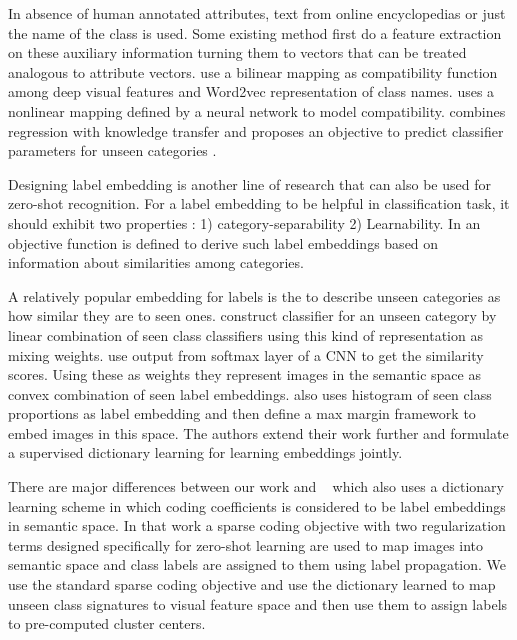 \documentclass[wcp]{jmlr}
\begin{document}
 In absence of human annotated attributes, text from online encyclopedias or just the name of the class is used. Some existing method
 first do a feature extraction on these auxiliary information turning them to vectors that can be treated analogous to attribute vectors.
 \cite{devise} use a bilinear mapping as compatibility function among deep visual features and Word2vec \cite{word2vec} representation of
 class names. \cite{ba2015} uses a nonlinear mapping defined by a neural network to model compatibility.
  \cite{mohamed13} combines regression with knowledge transfer and proposes an objective to predict classifier parameters
 for unseen categories .

 Designing label embedding is another line of research that can also be used for zero-shot recognition. For a label embedding to be helpful in classification task,
 it should exhibit two properties \cite{Yu2013}: 1) category-separability 2) Learnability. In \cite{Yu2013} an objective function is defined to derive
 such label embeddings based on information about similarities among categories.

A relatively popular embedding for labels is the to describe unseen categories as how similar they are to seen ones.
\cite{costa} construct  classifier for an unseen category by linear combination of seen class classifiers
using this kind of representation as mixing weights. \cite{convex} use output from softmax layer of a CNN to get the similarity scores.
Using these as weights they represent images in the semantic space as convex combination of seen label embeddings.
\cite{sse} also uses histogram of seen class proportions as label embedding and then define a max margin framework to embed images
 in this space. The authors extend their work further \cite{agnostic} and formulate a supervised dictionary learning
 for learning embeddings jointly.


There are major differences between our work and  ~\cite{Kodirov2015} which also uses a dictionary learning scheme in which coding coefficients is considered to be
 label embeddings in semantic space. In that work a sparse coding objective with two regularization terms designed specifically for
 zero-shot learning are used to map images into semantic space and class labels are assigned to them using label propagation. We use
 the standard sparse coding objective and use the dictionary learned to map unseen class signatures to visual feature space and then
 use them to assign labels to pre-computed cluster centers.
\end{document}
